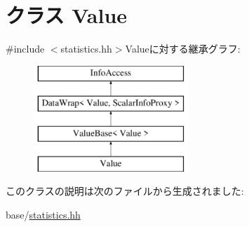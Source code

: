 \hypertarget{classStats_1_1Value}{
\section{クラス Value}
\label{classStats_1_1Value}
}


{\ttfamily \#include $<$statistics.hh$>$}Valueに対する継承グラフ:\begin{figure}[H]
\begin{center}
\leavevmode
\includegraphics[height=4cm]{classStats_1_1Value}
\end{center}
\end{figure}


このクラスの説明は次のファイルから生成されました:\begin{DoxyCompactItemize}
\item 
base/\hyperlink{statistics_8hh}{statistics.hh}\end{DoxyCompactItemize}
